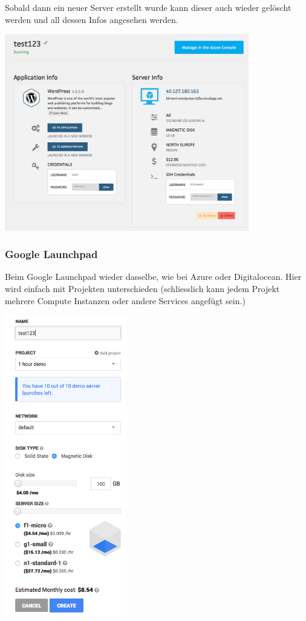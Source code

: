 Sobald dann ein neuer Server erstellt wurde kann dieser auch wieder gelöscht 
werden und all dessen Infos angesehen werden.

\includegraphics[width=0.8\textwidth]{./03_Analyse/03_Bitnami/images/azure_instanceinfos}

\subsubsection{Google Launchpad}

Beim Google Launchpad wieder dasselbe, wie bei Azure oder Digitalocean.
Hier wird einfach mit Projekten unterschieden (schliesslich kann jedem Projekt mehrere Compute Instanzen 
oder andere Services angefügt sein.)


\includegraphics[width=0.4\textwidth]{./03_Analyse/03_Bitnami/images/google_instancereation}


